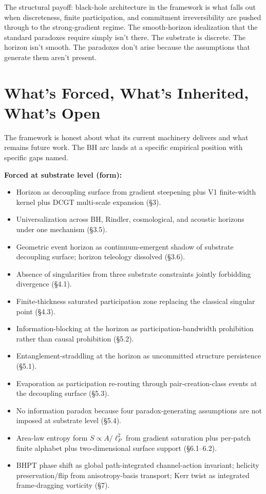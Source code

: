 \documentclass[11pt,a4paper]{article}
\begin{document}
The structural payoff: black-hole architecture in the framework is what falls out when discreteness, finite participation, and commitment irreversibility are pushed through to the strong-gradient regime. The smooth-horizon idealization that the standard paradoxes require simply isn't there. The substrate is discrete. The horizon isn't smooth. The paradoxes don't arise because the assumptions that generate them aren't present.

\section{What's Forced, What's Inherited, What's Open}

The framework is honest about what its current machinery delivers and what remains future work. The BH arc lands at a specific empirical position with specific gaps named.

\textbf{Forced at substrate level (form):}

\begin{itemize}[noitemsep]
  \item Horizon as decoupling surface from gradient steepening plus V1 finite-width kernel plus DCGT multi-scale expansion (\S3).
  \item Universalization across BH, Rindler, cosmological, and acoustic horizons under one mechanism (\S3.5).
  \item Geometric event horizon as continuum-emergent shadow of substrate decoupling surface; horizon teleology dissolved (\S3.6).
  \item Absence of singularities from three substrate constraints jointly forbidding divergence (\S4.1).
  \item Finite-thickness saturated participation zone replacing the classical singular point (\S4.3).
  \item Information-blocking at the horizon as participation-bandwidth prohibition rather than causal prohibition (\S5.2).
  \item Entanglement-straddling at the horizon as uncommitted structure persistence (\S5.1).
  \item Evaporation as participation re-routing through pair-creation-class events at the decoupling surface (\S5.3).
  \item No information paradox because four paradox-generating assumptions are not imposed at substrate level (\S5.4).
  \item Area-law entropy form $S \propto A/\ell_P^2$ from gradient saturation plus per-patch finite alphabet plus two-dimensional surface support (\S6.1--6.2).
  \item BHPT phase shift as global path-integrated channel-action invariant; helicity preservation/flip from anisotropy-basis transport; Kerr twist as integrated frame-dragging vorticity (\S7).
\end{itemize}
\end{document}
